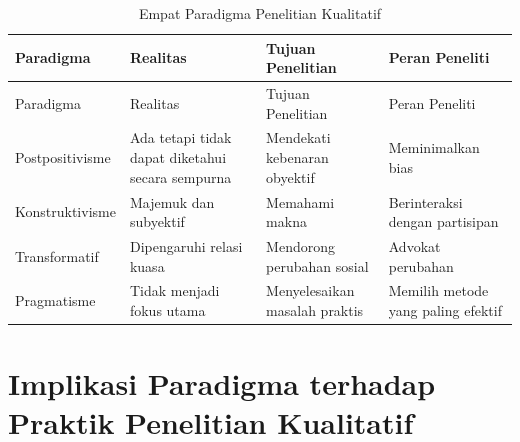 \documentclass[
  indonesian,
  letterpaper,
  DIV=11,
  numbers=noendperiod]{scrreprt}
\begin{document}
\begin{longtable}[]{@{}
  >{\raggedright\arraybackslash}p{}
  >{\raggedright\arraybackslash}p{}
  >{\raggedright\arraybackslash}p{}
  >{\raggedright\arraybackslash}p{}@{}}
\caption{Empat Paradigma Penelitian
Kualitatif}\label{tbl-paradigma}\tabularnewline
\toprule\noalign{}
\begin{minipage}[b]{\linewidth}\raggedright
Paradigma
\end{minipage} & \begin{minipage}[b]{\linewidth}\raggedright
Realitas
\end{minipage} & \begin{minipage}[b]{\linewidth}\raggedright
Tujuan Penelitian
\end{minipage} & \begin{minipage}[b]{\linewidth}\raggedright
Peran Peneliti
\end{minipage} \\
\midrule\noalign{}
\endfirsthead
\toprule\noalign{}
\begin{minipage}[b]{\linewidth}\raggedright
Paradigma
\end{minipage} & \begin{minipage}[b]{\linewidth}\raggedright
Realitas
\end{minipage} & \begin{minipage}[b]{\linewidth}\raggedright
Tujuan Penelitian
\end{minipage} & \begin{minipage}[b]{\linewidth}\raggedright
Peran Peneliti
\end{minipage} \\
\midrule\noalign{}
\endhead
\bottomrule\noalign{}
\endlastfoot
Postpositivisme & Ada tetapi tidak dapat diketahui secara sempurna &
Mendekati kebenaran obyektif & Meminimalkan bias \\
Konstruktivisme & Majemuk dan subyektif & Memahami makna & Berinteraksi
dengan partisipan \\
Transformatif & Dipengaruhi relasi kuasa & Mendorong perubahan sosial &
Advokat perubahan \\
Pragmatisme & Tidak menjadi fokus utama & Menyelesaikan masalah praktis
& Memilih metode yang paling efektif \\
\end{longtable}

\section{Implikasi Paradigma terhadap Praktik Penelitian
Kualitatif}\label{implikasi-paradigma-terhadap-praktik-penelitian-kualitatif}
\end{document}
